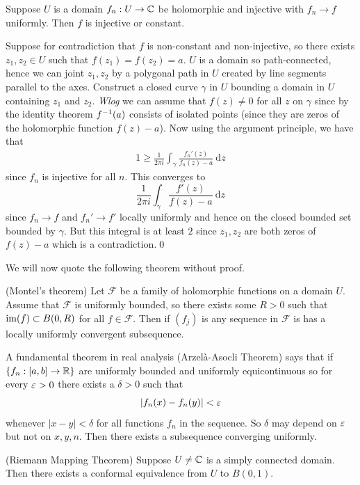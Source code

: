 \documentclass{article}
\begin{document}
\begin{proposition}
  Suppose $ U $ is a domain $ f_n:U\to \mathbb{C} $ be holomorphic and injective with $ f_n\to f $ uniformly. Then $ f $ is injective or constant.
\end{proposition}
\pf Suppose for contradiction that $ f $ is non-constant and non-injective, so there exists $ z_1,z_2\in U $ such that $ f(z_1)=f(z_2) = a $. $ U $ is a domain so path-connected, hence we can joint $ z_1,z_2 $ by a polygonal path in $ U $ created by line segments parallel to the axes. Construct a closed curve $ \gamma $ in $ U $ bounding a domain in $ U $ containing $ z_1 $ and $ z_2 $. \textit{Wlog} we can assume that $ f(z)\ne 0 $ for all $ z $ on $ \gamma $ since by the identity theorem $ {f}^{-1}(a) $ consists of isolated points (since they are zeros of the holomorphic function $ f(z) - a $). Now using the argument principle, we have that
\begin{align*}
	1 \ge \frac 1{2\pi i}\int_\gamma\frac{f_n'(z)}{f_n(z) - a} \ \mathrm dz
\end{align*}
since $ f_n $ is injective for all $ n $. This converges to
\[
	\frac 1{2\pi i}\int_\gamma \frac{f'(z)}{f(z)-a}\ \mathrm dz
\]
since $ f_n\to f $ and $ f_n'\to f' $ locally uniformly and hence on the closed bounded set bounded by $ \gamma $. But this integral is at least $ 2 $ since $ z_1,z_2 $ are both zeros of $ f(z)-a $ which is a contradiction.\qed
\par
We will now quote the following theorem without proof.
\begin{theorem}
		(Montel's theorem) Let $ \mathcal F $ be a family of holomorphic functions on a domain $ U $. Assume that $ \mathcal F $ is uniformly bounded, so there exists some $ R>0 $ such that $ \operatorname{im}(f)\subset B(0,R) $ for all $ f\in \mathcal F $. Then if $ (f_j) $ is any sequence in $ \mathcal F $ is has a locally uniformly convergent subsequence.
\end{theorem}
\begin{remark}
	A fundamental theorem in real analysis (Arzel\`a-Asocli Theorem) says that if $ \{f_n:[a,b]\to \mathbb{R}\} $ are uniformly bounded and uniformly equicontinuous so for every $ \varepsilon>0 $ there exists a $ \delta>0 $ such that 
	\[
	  |f_n(x)-f_n(y)| < \varepsilon
	\]
	whenever $ |x-y|<\delta $ for all functions $ f_n $ in the sequence. So $ \delta $ may depend on $ \varepsilon $ but not on $ x,y,n $. Then there exists a subsequence converging uniformly.
\end{remark}
\begin{theorem}
	(Riemann Mapping Theorem) Suppose $ U \ne \mathbb{C} $ is a simply connected domain. Then there exists a conformal equivalence from $ U $ to $ B(0,1) $.
\end{theorem}
\end{document}
